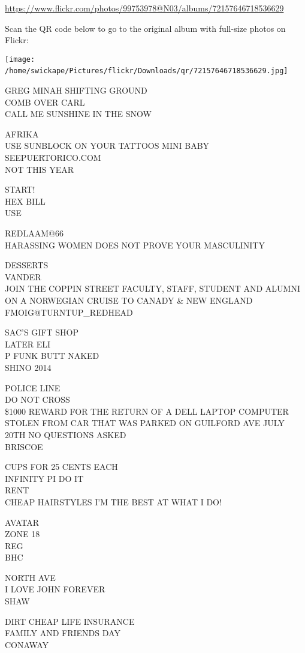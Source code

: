 \documentclass[10pt,letterpaper]{article}
\begin{document}
\url{https://www.flickr.com/photos/99753978@N03/albums/72157646718536629}

Scan the QR code below to go to the original album with full-size photos on Flickr:

\texttt{[image: /home/swickape/Pictures/flickr/Downloads/qr/72157646718536629.jpg]}
\

GREG MINAH SHIFTING GROUND\\
COMB OVER CARL\\
CALL ME SUNSHINE IN THE SNOW

AFRIKA\\
USE SUNBLOCK ON YOUR TATTOOS MINI BABY\\
SEEPUERTORICO.COM\\
NOT THIS YEAR

START!\\
HEX BILL\\
USE

REDLAAM@66\\
HARASSING WOMEN DOES NOT PROVE YOUR MASCULINITY

DESSERTS\\
VANDER\\
JOIN THE COPPIN STREET FACULTY, STAFF, STUDENT AND ALUMNI ON A NORWEGIAN CRUISE TO CANADY \& NEW ENGLAND\\
FMOIG@TURNTUP\_REDHEAD

SAC'S GIFT SHOP\\
LATER ELI\\
P FUNK BUTT NAKED\\
SHINO 2014

POLICE LINE\\
DO NOT CROSS\\
\$1000 REWARD FOR THE RETURN OF A DELL LAPTOP COMPUTER STOLEN FROM CAR THAT WAS PARKED ON GUILFORD AVE JULY 20TH NO QUESTIONS ASKED\\
BRISCOE

CUPS FOR 25 CENTS EACH\\
INFINITY PI DO IT\\
RENT\\
CHEAP HAIRSTYLES I'M THE BEST AT WHAT I DO!

AVATAR\\
ZONE 18\\
REG\\
BHC

NORTH AVE\\
I LOVE JOHN FOREVER\\
SHAW

DIRT CHEAP LIFE INSURANCE\\
FAMILY AND FRIENDS DAY\\
CONAWAY
\end{document}
